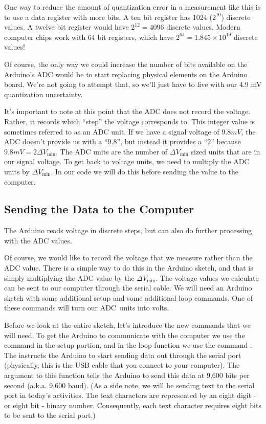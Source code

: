One way to reduce the amount of quantization error in a measurement like this
is to use a data register with more bits. A ten bit register has 1024 
($2^{10}$) discrete
values. A twelve bit register would have $2^{12}=4096$
discrete values. Modern computer chips work with 64 bit registers, which have
$2^{64}=1.845\times10^{19}$ discrete values!

Of course, the only way we could increase the number of bits available on the
Arduino's ADC would be to start replacing physical elements on the Arduino
board. We're not going to attempt that, so we'll just have to live with our
4.9 mV quantization uncertainty.

It's important to note at this point that the ADC does not record the voltage.
Rather, it records which ``step'' the voltage corresponds to. This integer value
is sometimes referred to as an ADC unit.
If we have a signal voltage of $9.8\unit{mV}$, the ADC doesn't provide
us with a ``$9.8$'', but instead it provides a ``2''
because $9.8\unit{mV}=2\Delta V_{\min }.$ The ADC units are the
number of $\Delta V_{\min }$ sized units that are in our signal voltage. To
get back to voltage units, we need to multiply the ADC units 
by $\Delta V_{\min }.$ In our
code we will do this before sending the value to the computer.

\subsection{Sending the Data to the Computer}

The Arduino reads voltage in discrete steps, but can also do further processing
with the ADC values.

Of course, we would like to record the voltage that we measure rather than
the ADC value. There is a
simple way to do this in the Arduino sketch, and that is simply multiplying 
the ADC value by the $\Delta V_{\min}$. 
The voltage values we calculate can be sent to our
computer through the serial cable. We will need an Arduino sketch with some
additional setup and some additional loop commands. One of these commands
will turn our ADC\ units into volts.

Before we look at the entire sketch, let's introduce the new commands that
we will need. To get the Arduino to communicate with the computer we use the
command  in the setup portion, and 
in the loop function we use the command . The
 instructs the Arduino to start sending data out
through the serial port (physically, this is the USB cable that you connect to 
your computer). The  argument to this function tells the Arduino
to send this data at 9,600 bits per second (a.k.a. 9,600 baud). (As a side
note, we will be sending text to the serial port in today's activities. The
text characters are represented by an eight digit - or eight bit - binary 
number. Consequently, each text character requires eight bits to be sent to
the serial port.) 

